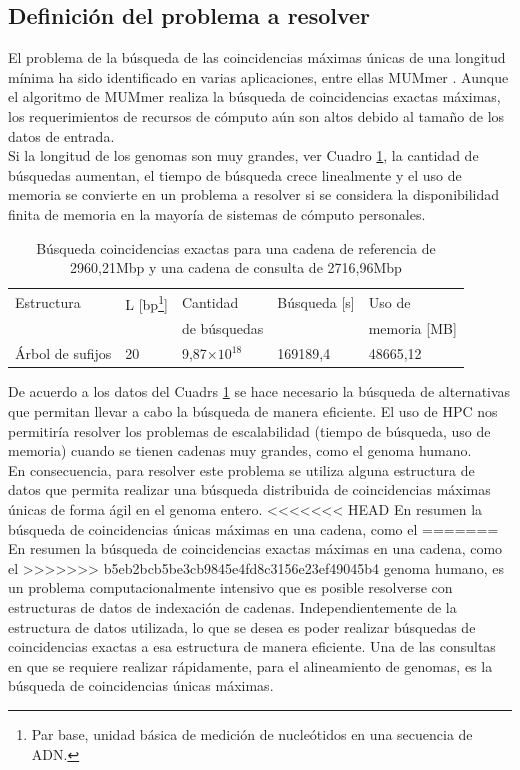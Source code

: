 \documentclass[12pt,a4paper]{article}
\providecommand{\e}[1]{\ensuremath{\times 10^{#1}}}
\begin{document}
\subsection{Definición del problema a resolver}
\indent
El problema de la búsqueda de las coincidencias máximas únicas de una longitud mínima ha sido identificado en varias aplicaciones, entre ellas MUMmer \cite{Mummer3}. Aunque el algoritmo de MUMmer realiza la búsqueda de coincidencias exactas máximas, los requerimientos de recursos de cómputo aún son altos debido al tamaño de los datos de entrada.\\
\indent
Si la longitud de los genomas son muy grandes, ver Cuadro \ref{tab:buscar3}, 
la cantidad de búsquedas aumentan, el tiempo de búsqueda
crece linealmente y el uso de memoria se convierte en un problema a resolver si
se considera la disponibilidad finita de memoria en la mayoría de sistemas de
cómputo personales.\\
\begin{table}[ h!]
  \begin{small}
    \begin{center}
      \begin{tabular}{lllll}
        Estructura & L [bp\footnote{Par base, unidad básica de medición de nucleótidos en una secuencia de ADN.}] & Cantidad  & Búsqueda [s] & Uso de\\
        & & de búsquedas & & memoria [MB]\\
        \hline
        Árbol de sufijos & 20 & 9,87\e{18}  & 169189,4 & 48665,12\\
        \hline
      \end{tabular}
    \end{center}
  \end{small}
  \caption{Búsqueda coincidencias exactas para una cadena de referencia de 
  2960,21Mbp y una cadena de consulta de 2716,96Mbp}
  \label{tab:buscar3}
\end{table}
\indent
De acuerdo a los datos del Cuadrs \ref{tab:buscar3} se hace necesario la búsqueda de alternativas que 
permitan llevar a cabo la búsqueda de manera eficiente. El uso de HPC nos permitiría
resolver los problemas de escalabilidad (tiempo de búsqueda, uso de memoria) cuando 
se tienen cadenas muy grandes, como el genoma humano.\\
En consecuencia, para resolver este problema se utiliza alguna estructura de datos que 
permita realizar una búsqueda distribuida de coincidencias máximas únicas de forma ágil 
en el genoma entero. 
\indent
<<<<<<< HEAD
En resumen la búsqueda de coincidencias únicas máximas en una cadena, como el 
=======
En resumen la búsqueda de coincidencias exactas máximas en una cadena, como el 
>>>>>>> b5eb2bcb5be3cb9845e4fd8c3156e23ef49045b4
genoma humano, es un problema computacionalmente intensivo que es posible 
resolverse con estructuras de datos de indexación de cadenas. 
\indent
Independientemente de la estructura de datos utilizada, lo que se desea es poder realizar búsquedas de coincidencias exactas a esa estructura de manera eficiente. 
Una de las consultas en que se requiere realizar rápidamente, para el alineamiento de genomas, es la búsqueda de coincidencias únicas máximas. 
\end{document}

